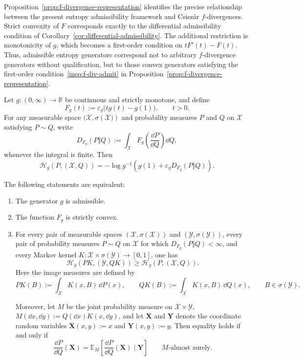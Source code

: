 \documentclass[reqno]{amsart}
\begin{document}
Proposition~\ref{prop:f-divergence-representation} identifies the precise
relationship between the present entropy admissibility framework and
Csisz\'ar $f$-divergences. Strict convexity of $F$ corresponds
exactly to the differential admissibility condition of Corollary~\ref{cor:differential-admissibility}.
The additional restriction is monotonicity of $g$, which becomes a
first-order condition on 
$t F'(t)- F(t)$.
Thus, admissible entropy generators correspond not to arbitrary
$f$-divergence generators without qualification, but to those convex
generators satisfying the  first-order condition~\eqref{ineq:f-div-admit}  in Proposition~\ref{prop:f-divergence-representation}.




\begin{prop}
\label{prop:data-processing}
Let $g:(0,\infty)\to\mathbb R$ be continuous and strictly monotone, and define
$$
F_g(t)
:=
\varepsilon_g\big(tg(t)-g(1)\big),
\qquad t>0.
$$
For any measurable space $(\mathcal{X},\sigma({\mathcal{X})})$ and probability
measures $P$ and $Q$ on $\mathcal X$ satisfying $P\sim Q$, write
$$
D_{F_g}(P\Vert Q)
:=
\int_{\mathcal X}
F_g\left(\frac{\dd P}{\dd Q}\right)\dd Q,
$$
whenever the integral is finite. Then
$$
\mathcal H_g(P,(\mathcal X,Q))
=
-\log g^{-1}
\left(
g(1)+\varepsilon_gD_{F_g}(P\Vert Q)
\right).
$$

The following statements are equivalent:
\begin{enumerate}
\item The generator $g$ is admissible.
\item The function $F_g$ is strictly convex.
\item For every pair of measurable spaces
$(\mathcal{X}, \sigma(\mathcal{X}))$ and $(\mathcal{Y},\sigma(\mathcal{Y}))$, every pair of probability measures $P\sim Q$ on $\mathcal X$ for which $D_{F_g}(P\Vert Q)<\infty$, and every Markov kernel $
K:\mathcal{X}\times\sigma(\mathcal{Y})\rightarrow[0,1]$,
one has
$$
\mathcal{H}_g(PK,(\mathcal{Y},QK))
\geq
\mathcal{H}_g(P,(\mathcal{X},Q)).
$$
Here the image measures are defined by
$$
PK(B):=\int_{\mathcal X}K(x,B)\,\dd P(x),
\qquad
QK(B):=\int_{\mathcal X}K(x,B)\,\dd Q(x),
\qquad B\in \sigma(\mathcal{Y}).
$$

Moreover, let $M$ be the joint probability measure on
$\mathcal X\times\mathcal Y$,  $
M(\dd x,\dd y):=Q(\dd x)K(x,\dd y)$,
and let $\mathbf X$ and $\mathbf Y$ denote the coordinate random
variables $\mathbf{X}(x,y):=x$
and $\mathbf{Y}(x,y):=y$.
Then equality holds if and only if
$$
\frac{\dd P}{\dd Q}(\mathbf X)
=
\mathbb E_M\!\left[\frac{\dd P}{\dd Q}(\mathbf X)\mid\mathbf Y\right]
\qquad M\text{-almost surely}.
$$

\end{enumerate}
\end{prop}
\end{document}
